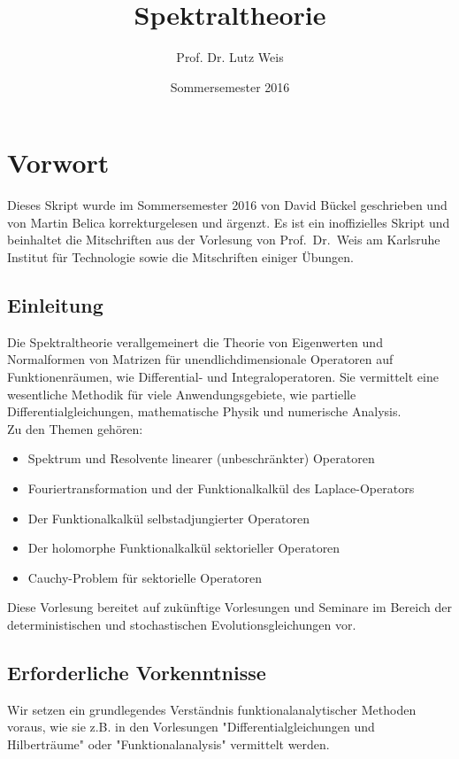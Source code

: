 \documentclass[12pt,a4paper,titlepage]{scrartcl}
\title{Spektraltheorie}
\author{Prof. Dr. Lutz Weis}
\date{Sommersemester 2016}
\numberwithin{equation}{section}
\begin{document}
	\maketitle
	

	\section*{Vorwort}
	Dieses Skript wurde im Sommersemester 2016 von David Bückel geschrieben und von Martin Belica korrekturgelesen und ärgenzt. Es ist ein inoffizielles Skript und beinhaltet die Mitschriften aus der Vorlesung von Prof.~Dr.~Weis am Karlsruhe Institut für Technologie sowie die Mitschriften einiger Übungen.

	\thispagestyle{empty}

	\subsection*{Einleitung}

	Die Spektraltheorie verallgemeinert die Theorie von Eigenwerten und Normalformen von Matrizen für unendlichdimensionale Operatoren auf Funktionenräumen, wie Differential- und Integraloperatoren. Sie vermittelt eine wesentliche Methodik für viele Anwendungsgebiete, wie partielle Differentialgleichungen, mathematische Physik und numerische Analysis. \\

	Zu den Themen gehören:

  	\begin{itemize}
    	\item Spektrum und Resolvente linearer (unbeschränkter) Operatoren
    	\item Fouriertransformation und der Funktionalkalkül des Laplace-Operators
    	\item Der Funktionalkalkül selbstadjungierter Operatoren
    	\item Der holomorphe Funktionalkalkül sektorieller Operatoren
    	\item Cauchy-Problem für sektorielle Operatoren
 	\end{itemize}
  
	Diese Vorlesung bereitet auf zukünftige Vorlesungen und Seminare im Bereich der deterministischen und stochastischen Evolutionsgleichungen vor.

	\subsection*{Erforderliche Vorkenntnisse}
	Wir setzen ein grundlegendes Verständnis funktionalanalytischer Methoden voraus, wie sie z.B. in den Vorlesungen "Differentialgleichungen und Hilberträume" oder "Funktionalanalysis" vermittelt werden.
	
\end{document}
